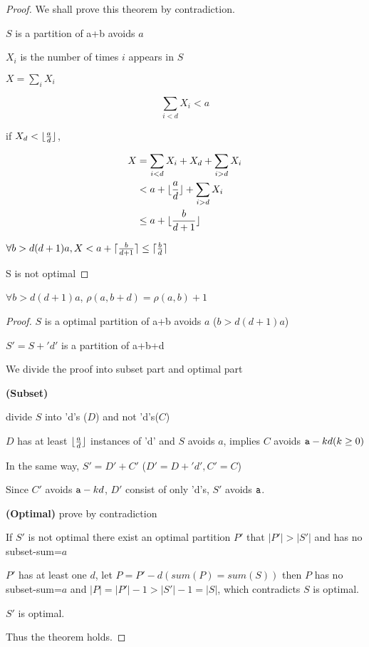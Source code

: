 \begin{proof}
    We shall prove this theorem by contradiction.  

    $S$ is a partition of a+b avoids $a$

    $X_i$ is the number of times $i$ appears in $S$

    $X = \sum_i{X_i}$

    \begin{equation}
        \sum_{i<d}{X_i}<a
    \end{equation}

    if $X_d<\lfloor\frac{a}{d}\rfloor$,

    \begin{align*}
        X&=\sum_{i<d}{X_i}+X_d+\sum_{i>d}{X_i}\\
         &<a+\lfloor\frac{a}{d}\rfloor+\sum_{i>d}{X_i}\\
         &\leq a+\lfloor\frac{b}{d+1}\rfloor
    \end{align*}

    $\forall b>d(d+1)a, X<a+\lceil\frac{b}{d+1}\rceil\leq \lceil\frac{b}{d}\rceil$

    S is not optimal
\end{proof}

\begin{theorem}
	$\forall b>d(d+1)a$, $\rho(a,b+d)=\rho(a,b)+1$
\end{theorem}

\begin{proof}
    

    $S$ is a optimal partition of a+b avoids $a$ ($b>d(d+1)a$)
    
    $S'=S+'d'$ is a partition of a+b+d 

    We divide the proof into subset part and optimal part

    {\bf(Subset)}

    divide $S$ into 'd's ($D$) and not 'd's($C$)
    
    $D$ has at least $\lfloor\frac{a}{d}\rfloor$ instances of 'd' and $S$ avoids $a$, implies $C$ avoids $\mathtt{a}-kd (k\geq0)$

    In the same way, $S'=D'+C'$ ($D'=D+'d', C'=C$)

    Since $C'$ avoids $\mathtt{a}-kd$, $D'$ consist of only 'd's, $S'$ avoids $\mathtt{a}$.

    {\bf(Optimal)}
        prove by contradiction

        If $S'$ is not optimal there exist an optimal partition $P'$ that $|P'|>|S'|$ and has no subset-sum=$a$

        $P'$ has at least one $d$, let $P=P'-d(sum(P)=sum(S))$ then $P$ has no subset-sum=$a$ and $|P|=|P'|-1>|S'|-1=|S|$, which contradicts $S$ is optimal.

        $S'$ is optimal.

    Thus the theorem holds.
\end{proof}

